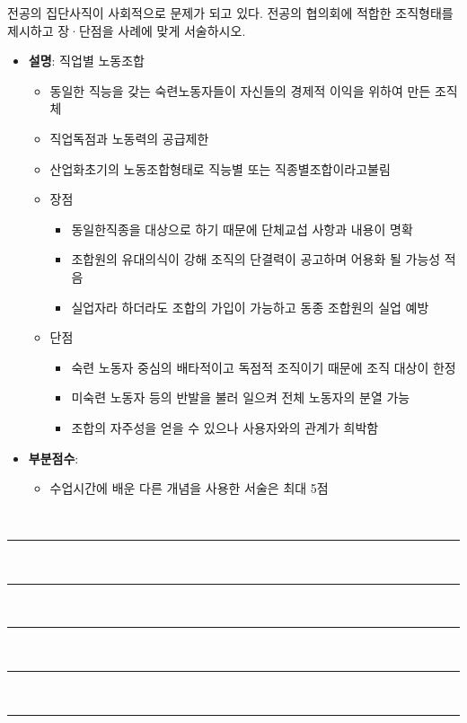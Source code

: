 \documentclass[11pt,answers]{exam} %
\begin{document}
\begin{questions}
\ifprintanswers\relax
    \pagebreak%
\fi
\question[10] 전공의 집단사직이 사회적으로 문제가 되고 있다. 전공의 협의회에 적합한 조직형태를 제시하고 장·단점을 사례에 맞게 서술하시오.
    \ifprintanswers\relax
        \begin{itemize}
            \item \textbf{설명}: 직업별 노동조합
                \begin{itemize}
                    \item 동일한 직능을 갖는 숙련노동자들이 자신들의 경제적 이익을 위하여 만든 조직체
                    \item 직업독점과 노동력의 공급제한
                    \item 산업화초기의 노동조합형태로 직능별 또는 직종별조합이라고불림
                    \item 장점
                    \begin{itemize}
                       \item 동일한직종을 대상으로 하기 때문에 단체교섭 사항과 내용이 명확
                       \item 조합원의 유대의식이 강해 조직의 단결력이 공고하며 어용화 될 가능성 적음
                       \item 실업자라 하더라도 조합의 가입이 가능하고 동종 조합원의 실업 예방
                    \end{itemize}
                    \item 단점
                    \begin{itemize}
                       \item 숙련 노동자 중심의 배타적이고 독점적 조직이기 때문에 조직 대상이 한정
                       \item 미숙련 노동자 등의 반발을 불러 일으켜 전체 노동자의 분열 가능
                       \item 조합의 자주성을 얻을 수 있으나 사용자와의 관계가 희박함
                    \end{itemize}
                \end{itemize}
            \item \textbf{부분점수}:
                \begin{itemize}
                    \item 수업시간에 배운 다른 개념을 사용한 서술은 최대 5점
                \end{itemize}
        \end{itemize}
    \else
        \\[3pt]
        \rule{\linewidth}{0.4pt} \\[3pt]
        \rule{\linewidth}{0.4pt} \\[3pt]
        \rule{\linewidth}{0.4pt} \\[3pt]
        \rule{\linewidth}{0.4pt} \\[3pt]
        \rule{\linewidth}{0.4pt}
    \fi


\end{questions}
\end{document}
